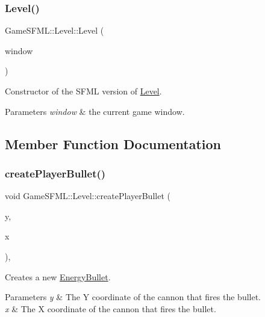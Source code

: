 \subsubsection{\texorpdfstring{Level()}{Level()}}
{\footnotesize\ttfamily Game\+S\+F\+M\+L\+::\+Level\+::\+Level (\begin{DoxyParamCaption}\item[{window\+\_\+ptr \&}]{window }\end{DoxyParamCaption})\hspace{0.3cm}{\ttfamily [explicit]}}

Constructor of the S\+F\+ML version of \hyperlink{classGameSFML_1_1Level}{Level}. 
\begin{DoxyParams}{Parameters}
{\em window} & the current game window. \\
\hline
\end{DoxyParams}


\subsection{Member Function Documentation}
\mbox{\label{classGameSFML_1_1Level_adafff50ab250a1d85f1b1d48c085bac1}} 
\subsubsection{\texorpdfstring{create\+Player\+Bullet()}{createPlayerBullet()}}
{\footnotesize\ttfamily void Game\+S\+F\+M\+L\+::\+Level\+::create\+Player\+Bullet (\begin{DoxyParamCaption}\item[{double}]{y,  }\item[{double}]{x }\end{DoxyParamCaption})\hspace{0.3cm}{\ttfamily [override]}, {\ttfamily [virtual]}}

Creates a new \hyperlink{classGameSFML_1_1EnergyBullet}{Energy\+Bullet}. 
\begin{DoxyParams}{Parameters}
{\em y} & The Y coordinate of the cannon that fires the bullet. \\
\hline
{\em x} & The X coordinate of the cannon that fires the bullet. \\
\hline
\end{DoxyParams}



